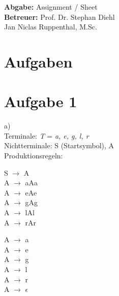 \documentclass[11pt,a4paper]{article}
\title{\course}
\author{\studentname\\Matrikelnummer: \studentnumber\\\institute}
\date{\today}
\begin{document}
\maketitle

\begin{center}
    \textbf{Abgabe:} Assignment / Sheet \\
    \vspace{4mm}
    \textbf{Betreuer:} Prof. Dr. Stephan Diehl\\Jan Niclas Ruppenthal, M.Sc.
\end{center}

\bigskip

\section*{Aufgaben}

\section{Aufgabe 1}
a) \\
    Terminale: \textit{T} = {\textit{a, e, g, l, r}}\\
    Nichtterminale: {S (Startsymbol), A}    
\\   
    Produktionsregeln: \\

\begin{center}    
    S $\rightarrow$ A \\

    A $\rightarrow$ aAa \\
    A $\rightarrow$ eAe \\
    A $\rightarrow$ gAg \\
    A $\rightarrow$ lAl \\
    A $\rightarrow$ rAr \\

    A $\rightarrow$ a \\
    A $\rightarrow$ e \\
    A $\rightarrow$ g \\
    A $\rightarrow$ l \\
    A $\rightarrow$ r \\
    
    A $\rightarrow$ $\epsilon$ \\

\end{center}
\end{document}

